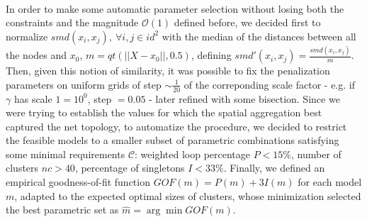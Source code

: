 \documentclass[11pt,twoside]{report}
\begin{document}
\\
In order to make some automatic parameter selection without losing both the constraints and the magnitude $ \mathcal{O}(1) $ defined before, we decided first to normalize $ smd(x_i,x_j),\ \forall i,j \in {id}^2$ with the median of the distances between all the nodes and $ x_0 $, $ m=qt(||X -x_0||,0.5) $, defining $ smd'(x_i,x_j)=\frac{smd(x_i,x_j)}{m} $. Then, given this notion of similarity, it was possible to fix the penalization parameters on uniform grids of step $ \sim \frac{1}{20} $ of the correponding scale factor - e.g. if $ \gamma $ has scale $ 1=10^0 $, step $ =0.05 $ - later refined with some bisection. Since we were trying to establish the values for which the spatial aggregation best captured the net topology, to automatize the procedure, we decided to restrict the feasible models to a smaller subset of parametric combinations satisfying some minimal requirements $ \mathcal{C} $: weighted loop percentage $ P<15\% $, number of clusters $nc >40 $, percentage of singletons $ I<33\% $. Finally, we defined an empirical goodness-of-fit function $ GOF(m)=P(m)+3I(m) $ for each model $ m $, adapted to the expected optimal sizes of clusters, whose minimization selected the best parametric set as $ \hat{m}=\arg\min GOF(m) $.
\end{document}
